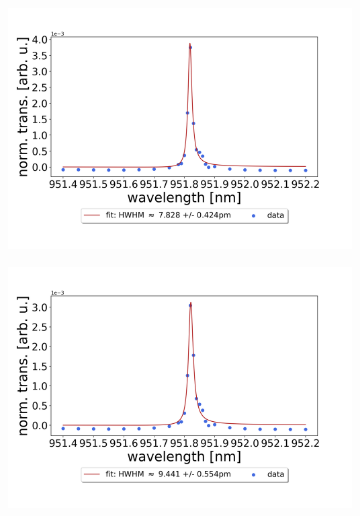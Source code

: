 \begin{figure}[h!]
    \centering
    \begin{subfigure}[b]{0.49\textwidth}
        \includegraphics[width=\textwidth]{figures/results/single fano fits/380um_M5_fit_1.png}
        \caption{}
        \label{fig:380um_M5_fit_1}
    \end{subfigure}
    \begin{subfigure}[b]{0.49\textwidth}
        \includegraphics[width=\textwidth]{figures/results/single fano fits/380um_M5_fit_2.png}
        \caption{}
        \label{fig:380um_M5_fit_2}
    \end{subfigure}
    \begin{subfigure}[b]{0.49\textwidth}

\end{subfigure}
\end{figure}
